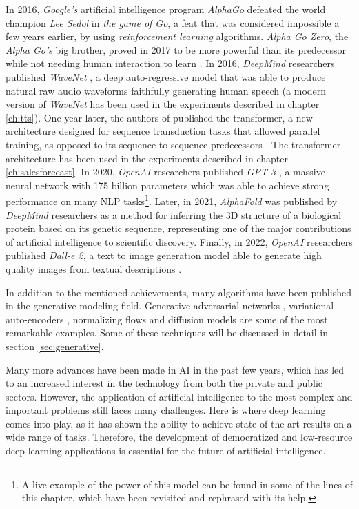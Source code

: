 In 2016, \textit{Google's} artificial intelligence program \textit{AlphaGo} \autocite{silver2016} defeated the world champion \textit{Lee Sedol} in \textit{the game of Go}, a feat that was considered impossible a few years earlier, by using \textit{reinforcement learning} algorithms. \textit{Alpha Go Zero}, the \textit{Alpha Go's} big brother, proved in 2017 to be more powerful than its predecessor while not needing human interaction to learn \autocite{Silver2017a, Silver2017b}. In 2016, \textit{DeepMind} researchers published \textit{WaveNet} \autocite{vanderoord2016}, a deep auto-regressive model that was able to produce natural raw audio waveforms faithfully generating human speech (a modern version of \textit{WaveNet} has been used in the experiments described in chapter \ref{ch:tts}). One year later, the authors of \citet{vaswani2017} published the transformer, a new architecture designed for sequence transduction tasks that allowed parallel training, as opposed to its sequence-to-sequence predecessors \autocite{sutskever2014}. The transformer architecture has been used in the experiments described in chapter \ref{ch:salesforecast}. In 2020, \textit{OpenAI} researchers published \textit{GPT-3} \autocite{brown2020}, a massive neural network with 175 billion parameters which was able to achieve strong performance on many NLP tasks\footnote{A live example of the power of this model can be found in some of the lines of this chapter, which have been revisited and rephrased with its help.}. Later, in 2021, \textit{AlphaFold} was published by \textit{DeepMind} researchers \autocite{Jumper2021} as a method for inferring the 3D structure of a biological protein based on its genetic sequence, representing one of the major contributions of artificial intelligence to scientific discovery. Finally, in 2022, \textit{OpenAI} researchers published \textit{Dall-e 2}, a text to image generation model able to generate high quality images from textual descriptions \autocite{aditya2022}.

In addition to the mentioned achievements, many algorithms have been published in the generative modeling field. Generative adversarial networks \autocite{Goodfellow2014}, variational auto-encoders \autocite{kingma2019}, normalizing flows \autocite{kingma2016, kobyzev} and diffusion models \autocite{Prafulla2021} are some of the most remarkable examples. Some of these techniques will be discussed in detail in section \ref{sec:generative}.

Many more advances have been made in AI in the past few years, which has led to an increased interest in the technology from both the private and public sectors. However, the application of artificial intelligence to the most complex and important problems still faces many challenges. Here is where deep learning comes into play, as it has shown the ability to achieve state-of-the-art results on a wide range of tasks. Therefore, the development of democratized and low-resource deep learning applications is essential for the future of artificial intelligence. 

